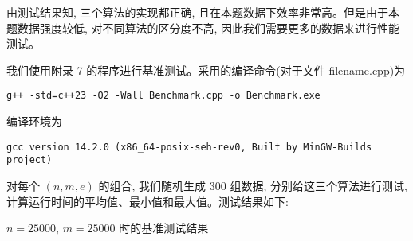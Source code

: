 由测试结果知, 三个算法的实现都正确, 且在本题数据下效率非常高。但是由于本题数据强度较低, 对不同算法的区分度不高, 因此我们需要更多的数据来进行性能测试。

我们使用附录 7 的程序进行基准测试。采用的编译命令(对于文件 filename.cpp)为
\begin{verbatim}
g++ -std=c++23 -O2 -Wall Benchmark.cpp -o Benchmark.exe
\end{verbatim}
编译环境为
\begin{verbatim}
gcc version 14.2.0 (x86_64-posix-seh-rev0, Built by MinGW-Builds project)
\end{verbatim}
对每个 $\left(n, m, e\right)$ 的组合, 我们随机生成 300 组数据, 分别给这三个算法进行测试, 计算运行时间的平均值、最小值和最大值。测试结果如下:

\begin{table}[H]
	\centering
	\caption{$n = 25000$, $m = 25000$ 时的基准测试结果}
	\label{tab:benchmark_e}
	

\end{table}
